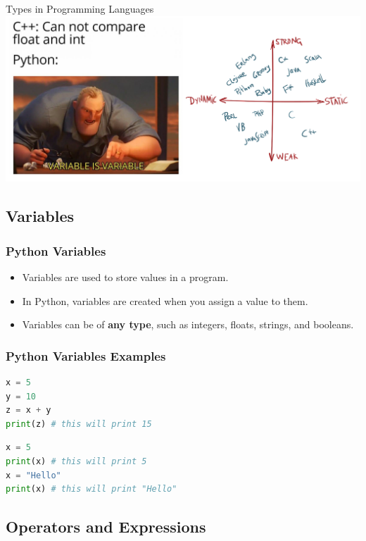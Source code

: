 \documentclass[aspectratio=169]{beamer}
\begin{document}
\begin{frame}{Types in Programming Languages}
    \centering
    \includegraphics[width=\textwidth]{imgs/types_meme.png}
\end{frame}

\subsection{Variables}

\begin{frame}
    \frametitle{Python Variables}

    \begin{itemize}
        \item Variables are used to store values in a program.
        \item In Python, variables are created when you assign a value to them.
        \item Variables can be of \textbf{any type}, such as integers, floats, strings, and booleans.
    \end{itemize}

\end{frame}

\begin{frame}[fragile]
    \frametitle{Python Variables Examples}

    \begin{lstlisting}[language=Python,caption={Simple Variable Assignment}]
x = 5
y = 10
z = x + y
print(z) # this will print 15
    \end{lstlisting}
    \begin{lstlisting}[language=Python, caption={Reassigning Variables}]
x = 5
print(x) # this will print 5
x = "Hello"
print(x) # this will print "Hello"
    \end{lstlisting}
\end{frame}

\subsection{Operators and Expressions}
\end{document}
